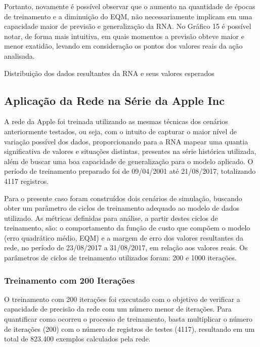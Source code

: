 Portanto, novamente é possível observar que o aumento na quantidade de épocas de treinamento e a diminuição do EQM, não necessariamente implicam em uma capacidade maior de previsão e generalização da RNA. No Gráfico 15 é possível notar, de forma mais intuitiva, em quais momentos a previsão obteve maior e menor exatidão, levando em consideração os pontos dos valores reais da ação analisada.

\begin{grafico}[h]
	\centering
	\caption{Distribuição dos dados resultantes da RNA e seus valores esperados}
	\label{lingua}
\end{grafico}

\subsection{Aplicação da Rede na Série da Apple Inc}
A rede da Apple foi treinada utilizando as mesmas técnicas dos cenários anteriormente testados, ou seja, com o intuito de capturar o maior nível de variação possível dos dados, proporcionando para a RNA mapear uma quantia significativa de valores e situações distintas, presentes na série histórica utilizada, além de buscar uma boa capacidade de generalização para o modelo aplicado. O período de treinamento preparado foi de 09/04/2001 até 21/08/2017, totalizando 4117 registros.

Para o presente caso foram construídos dois cenários de simulação, buscando obter um parâmetro de ciclos de treinamento adequado ao modelo de dados utilizado. As métricas definidas para análise, a partir destes ciclos de treinamento, são: o comportamento da função de custo que compõem o modelo (erro quadrático médio, EQM) e a margem de erro dos valores resultantes da rede, no período de 23/08/2017 a 31/08/2017, em relação aos valores reais. Os parâmetros de ciclos de treinamento utilizados foram: 200 e 1000 iterações.

\subsubsection{Treinamento com 200 Iterações}	
O treinamento com 200 iterações foi executado com o objetivo de verificar a capacidade de precisão da rede com um número menor de iterações. Para quantificar como ocorreu o processo de treinamento, basta multiplicar o número de iterações (200) com o número de registros de testes (4117), resultando em um total de 823.400 exemplos calculados pela rede.

